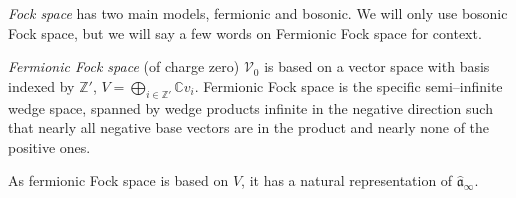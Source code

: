 \documentclass[10pt,a4paper,oneside,no-math,reqno]{amsart}%
\theoremstyle{plain}
\theoremstyle{definition}
\theoremstyle{remark}
\numberwithin{equation}{section}
\newcommand{\mb}[1]{\mathbb{#1}}
\newcommand{\mf}[1]{\mathfrak{#1}}
\newcommand{\mc}[1]{\mathcal{#1}}
\newcommand{\1}{\mathds{1}}
\newcommand{\Z}{\mb{Z}}
\newcommand{\<}{\langle}
\renewcommand{\>}{\rangle}
\begin{document}
\emph{Fock space} has two main models, fermionic and bosonic. We will only use bosonic Fock space, but we will say a few words on Fermionic Fock space for context.

\emph{Fermionic Fock space} (of charge zero) $ \mc{V}_0$ is based on a vector space with basis indexed by $\mathbb{Z}'$, $V=\bigoplus_{i\in\mathbb{Z}'}\mathbb{C}v_i$.  Fermionic Fock space is the specific semi--infinite wedge space, spanned by wedge products infinite in the negative direction such that nearly all negative base vectors are in the product and nearly none of the positive ones.



As fermionic Fock space is based on $ V$, it has a natural representation of $ \widehat{\mf{a}}_\infty$.
\end{document}
